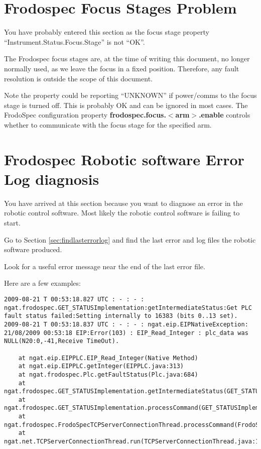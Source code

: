 \documentclass[10pt,a4paper]{article}
\begin{document}
\section{Frodospec Focus Stages Problem}
\label{sec:focusstageproblem}

You have probably entered this section as the focus stage property ``Instrument.Status.Focus.Stage'' is not ``OK''.

The Frodospec focus stages are, at the time of writing this document, no longer normally used, as we leave the
focus in a fixed position. Therefore, any fault resolution is outside the scope of this document.

Note the property could be reporting ``UNKNOWN'' if power/comms to the focus stage is turned off. 
This is probably OK and can be ignored in most cases. The FrodoSpec configuration property {\bf frodospec.focus.$<$arm$>$.enable} controls whether to communicate with the focus stage for the specified arm.

\section{Frodospec Robotic software Error Log diagnosis}
\label{sec:errorlogdiagnosis}

You have arrived at this section because you want to diagnose an error in the robotic control software. Most likely
the robotic control software is failing to start.

Go to Section \ref{sec:findlasterrorlog} and find the last error and log files the robotic software produced.

Look for a useful error message near the end of the last error file.

Here are a few examples:

\begin{verbatim}
2009-08-21 T 00:53:18.827 UTC : - : - : ngat.frodospec.GET_STATUSImplementation:getIntermediateStatus:Get PLC fault status failed:Setting internally to 16383 (bits 0..13 set).
2009-08-21 T 00:53:18.837 UTC : - : - : ngat.eip.EIPNativeException: 
21/08/2009 00:53:18 EIP:Error(103) : EIP_Read_Integer : plc_data was NULL(N20:0,-41,Receive TimeOut).

	at ngat.eip.EIPPLC.EIP_Read_Integer(Native Method)
	at ngat.eip.EIPPLC.getInteger(EIPPLC.java:313)
	at ngat.frodospec.Plc.getFaultStatus(Plc.java:684)
	at ngat.frodospec.GET_STATUSImplementation.getIntermediateStatus(GET_STATUSImplementation.java:637)
	at ngat.frodospec.GET_STATUSImplementation.processCommand(GET_STATUSImplementation.java:280)
	at ngat.frodospec.FrodoSpecTCPServerConnectionThread.processCommand(FrodoSpecTCPServerConnectionThread.java:268)
	at ngat.net.TCPServerConnectionThread.run(TCPServerConnectionThread.java:188)
\end{verbatim}
\end{document}
